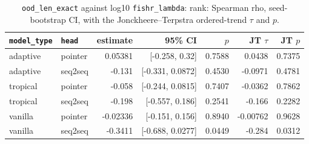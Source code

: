 \documentclass[10pt]{article}
\begin{document}
{\small
\begin{longtable}{llrrrrr}
\caption{\texttt{ood\_len\_exact} against log10 \texttt{fishr\_lambda}: rank: Spearman rho, seed-bootstrap CI, with the Jonckheere--Terpstra ordered-trend $\tau$ and $p$.}\label{tab:trend-ood_len_exact}\\
\toprule
\texttt{model\_type} & \texttt{head} & estimate & 95\% CI & $p$ & JT $\tau$ & JT $p$\\
\midrule
\endhead
adaptive & pointer & 0.05381 & [-0.258, 0.32] & 0.7588 & 0.0438 & 0.7375\\
adaptive & seq2seq & -0.131 & [-0.331, 0.0872] & 0.4530 & -0.0971 & 0.4781\\
tropical & pointer & -0.058 & [-0.244, 0.0815] & 0.7407 & -0.0362 & 0.7862\\
tropical & seq2seq & -0.198 & [-0.557, 0.186] & 0.2541 & -0.166 & 0.2282\\
vanilla & pointer & -0.02336 & [-0.151, 0.156] & 0.8940 & -0.00762 & 0.9628\\
vanilla & seq2seq & -0.3411 & [-0.688, 0.0277] & 0.0449 & -0.284 & 0.0312\\
\bottomrule
\end{longtable}
}
\end{document}
